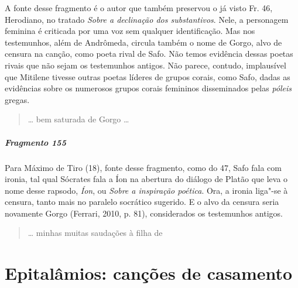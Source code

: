 {{\small A fonte desse fragmento é o autor que também preservou o já visto Fr. 46, Herodiano, no tratado
\textit{Sobre a declinação dos substantivos}. Nele, a personagem feminina é
criticada por uma voz sem qualquer identificação. Mas nos testemunhos, além de Andrômeda, circula também o nome de Gorgo, alvo de censura na canção, como poeta rival de Safo. Não temos evidência dessas poetas rivais que não sejam os testemunhos antigos. Não parece, contudo, implausível que Mitilene tivesse outras poetas líderes de grupos corais, como Safo, dadas as evidências sobre os numerosos  grupos corais femininos disseminados pelas \textit{póleis} gregas.}

\begin{verse}
\ldots{} bem saturada de Gorgo \ldots{}
\end{verse}

\paragraph{Fragmento 155}

{\small Para Máximo de Tiro (18), fonte desse fragmento, como do 47, Safo fala com ironia, tal qual
Sócrates fala a Íon na abertura do diálogo de Platão que leva o nome desse
rapsodo, \textit{Íon}, ou \textit{Sobre a inspiração poética}. Ora, a ironia
liga"-se à censura, tanto mais no paralelo socrático sugerido.
E o alvo da censura seria novamente Gorgo (Ferrari, 2010, p. 81), considerados os testemunhos antigos.}

\begin{verse}
\ldots{} minhas muitas saudações à filha de 
\end{verse}


\chapter[Epitalâmios: canções de casamento]{Epitalâmios: canções de casamento}


}
